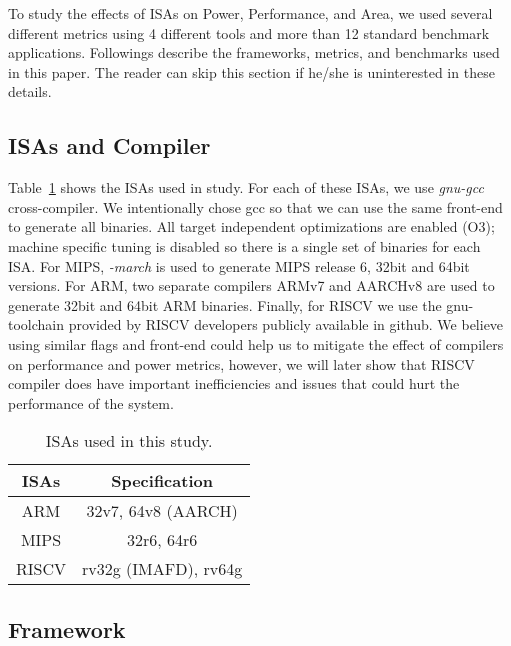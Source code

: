 
\label{sec:method}

\newcommand{\icount}{\textsc{icount}\xspace}

To study the effects of ISAs on Power, Performance, and Area, we used several different metrics using 4 different tools and more than 12 standard benchmark applications. Followings describe the frameworks, metrics, and benchmarks used in this paper. The reader can skip this section if he/she is uninterested in these details. 

\subsection{ISAs and Compiler}
Table~\ref{t:isa} shows the ISAs used in study. For each of these ISAs, we use \textit{gnu-gcc} cross-compiler. We intentionally chose gcc so
that we can use the same front-end to generate all binaries. All
target independent optimizations are enabled (O3); machine specific
tuning is disabled so there is a single set of binaries for each ISA. For MIPS, \textit{-march} is used to generate MIPS release 6, 32bit and 64bit versions. For ARM, two separate compilers ARMv7 and AARCHv8 are used to generate 32bit and 64bit ARM binaries. Finally, for RISCV we use the gnu-toolchain provided by RISCV developers publicly available in github. We believe using similar flags and front-end could help us to mitigate the effect of compilers on performance and power metrics, however, we will later show that RISCV compiler does have important inefficiencies and issues that could hurt the performance of the system. 

\begin{table}[h]
\centering
\caption{ISAs used in this study.}
\begin{tabular}{|c|c|}
\hline
\small \textbf{ISAs} & \small \textbf{Specification} \\
\hline \hline
\small ARM & \small  32v7, 64v8 (AARCH) \\
\hline
\small MIPS & \small 32r6, 64r6 \\
\hline
\small RISCV &\small  rv32g (IMAFD), rv64g \\
\hline
\end{tabular}
\label{t:isa}
\end{table}

\subsection{Framework} 
